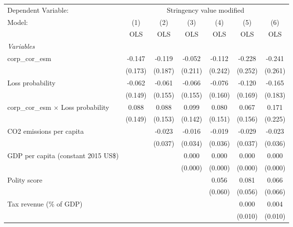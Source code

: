 
\begingroup
\centering
\begin{tabular}{lcccccc}
   \toprule
   Dependent Variable: & \multicolumn{6}{c}{Stringency value modified}\\
   Model:                                      & (1)     & (2)     & (3)     & (4)     & (5)     & (6)\\  
                                               &  OLS    & OLS     & OLS     & OLS     & OLS     & OLS\\  
   \midrule
   \emph{Variables}\\
   corp\_cor\_esm                              & -0.147  & -0.119  & -0.052  & -0.112  & -0.228  & -0.241\\   
                                               & (0.173) & (0.187) & (0.211) & (0.242) & (0.252) & (0.261)\\   
   Loss probability                            & -0.062  & -0.061  & -0.066  & -0.076  & -0.120  & -0.165\\   
                                               & (0.149) & (0.155) & (0.155) & (0.160) & (0.169) & (0.183)\\   
   corp\_cor\_esm $\times$ Loss probability    & 0.088   & 0.088   & 0.099   & 0.080   & 0.067   & 0.171\\   
                                               & (0.149) & (0.153) & (0.142) & (0.151) & (0.156) & (0.225)\\   
   CO2 emissions per capita                    &         & -0.023  & -0.016  & -0.019  & -0.029  & -0.023\\   
                                               &         & (0.037) & (0.034) & (0.036) & (0.037) & (0.036)\\   
   GDP per capita (constant 2015 US\$)         &         &         & 0.000   & 0.000   & 0.000   & 0.000\\   
                                               &         &         & (0.000) & (0.000) & (0.000) & (0.000)\\   
   Polity score                                &         &         &         & 0.056   & 0.081   & 0.066\\   
                                               &         &         &         & (0.060) & (0.056) & (0.066)\\   
   Tax revenue (\% of GDP)                     &         &         &         &         & 0.000   & 0.004\\   
                                               &         &         &         &         & (0.010) & (0.010)\\   

\end{tabular}
